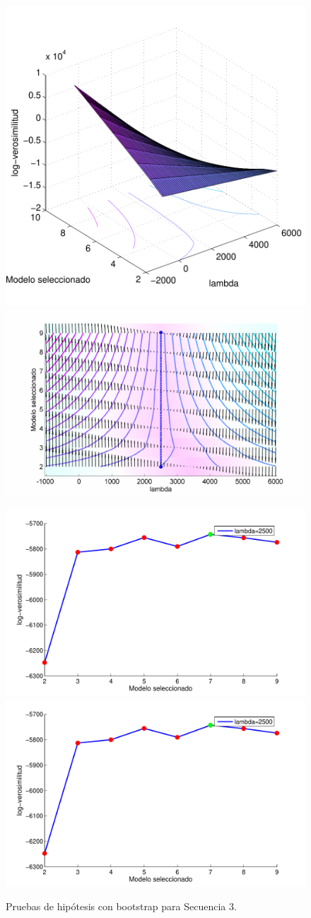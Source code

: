 \begin{figure}[H]
  \centerline  
  {\includegraphics[width=0.6\linewidth]{gfx/chap6/learboot1}
   \includegraphics[width=0.6\linewidth]{gfx/chap6/learboot2} }
  \centerline  
  {\includegraphics[width=0.6\linewidth]{gfx/chap6/learboot3}
   \includegraphics[width=0.6\linewidth]{gfx/chap6/learboot4}
  } \quad
  \caption{Pruebas de hipótesis con bootstrap para Secuencia 3.}
  \label{fig:prb1_boot}
\end{figure}

